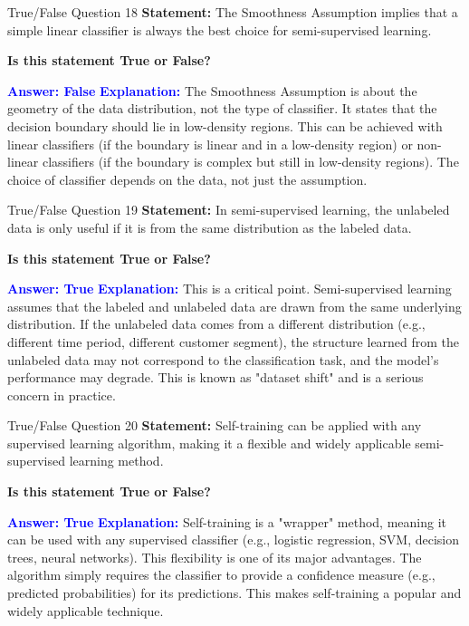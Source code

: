 \documentclass[8pt]{beamer}  %
\begin{document}
	\begin{frame}{True/False Question 18}
		\textbf{Statement:} The Smoothness Assumption implies that a simple linear classifier is always the best choice for semi-supervised learning.
		
		\vspace{0.3cm}
		\textbf{Is this statement True or False?}
		
		\vspace{0.2cm}
		\textcolor{blue}{\textbf{Answer: False}}
		\vspace{0.2cm}
		\textcolor{blue}{\textbf{Explanation:}} The Smoothness Assumption is about the geometry of the data distribution, not the type of classifier. It states that the decision boundary should lie in low-density regions. This can be achieved with linear classifiers (if the boundary is linear and in a low-density region) or non-linear classifiers (if the boundary is complex but still in low-density regions). The choice of classifier depends on the data, not just the assumption.
	\end{frame}
	
	\begin{frame}{True/False Question 19}
		\textbf{Statement:} In semi-supervised learning, the unlabeled data is only useful if it is from the same distribution as the labeled data.
		
		\vspace{0.3cm}
		\textbf{Is this statement True or False?}
		
		\vspace{0.2cm}
		\textcolor{blue}{\textbf{Answer: True}}
		\vspace{0.2cm}
		\textcolor{blue}{\textbf{Explanation:}} This is a critical point. Semi-supervised learning assumes that the labeled and unlabeled data are drawn from the same underlying distribution. If the unlabeled data comes from a different distribution (e.g., different time period, different customer segment), the structure learned from the unlabeled data may not correspond to the classification task, and the model's performance may degrade. This is known as "dataset shift" and is a serious concern in practice.
	\end{frame}
	
	\begin{frame}{True/False Question 20}
		\textbf{Statement:} Self-training can be applied with any supervised learning algorithm, making it a flexible and widely applicable semi-supervised learning method.
		
		\vspace{0.3cm}
		\textbf{Is this statement True or False?}
		
		\vspace{0.2cm}
		\textcolor{blue}{\textbf{Answer: True}}
		\vspace{0.2cm}
		\textcolor{blue}{\textbf{Explanation:}} Self-training is a "wrapper" method, meaning it can be used with any supervised classifier (e.g., logistic regression, SVM, decision trees, neural networks). This flexibility is one of its major advantages. The algorithm simply requires the classifier to provide a confidence measure (e.g., predicted probabilities) for its predictions. This makes self-training a popular and widely applicable technique.
	\end{frame}
	
\end{document}
